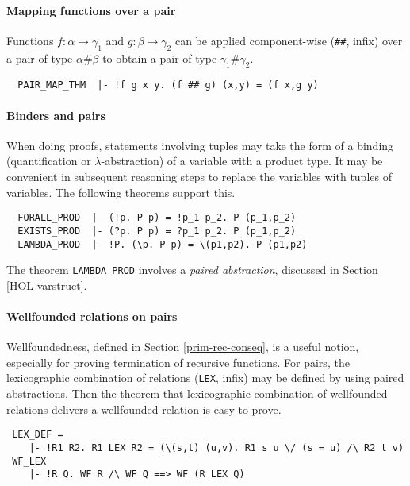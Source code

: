 \paragraph {Mapping functions over a pair}

Functions $f : \alpha \to \gamma_1$ and $g : \beta\to\gamma_2$ can be
applied component-wise ({\small\verb+##+}, infix) over a pair of type
$\alpha \# \beta$ to obtain a pair of type $\gamma_1 \# \gamma_2$.
%
\begin{hol}
{\small
\begin{verbatim}
  PAIR_MAP_THM  |- !f g x y. (f ## g) (x,y) = (f x,g y)
\end{verbatim}
}
\end{hol}

\paragraph {Binders and pairs}

When doing proofs, statements involving tuples may take the form of a
binding (quantification or $\lambda$-abstraction) of a variable with a
product type. It may be convenient in subsequent reasoning steps to
replace the variables with tuples of variables. The following theorems
support this.
%
 \begin{hol}
{\small
\begin{verbatim}
  FORALL_PROD  |- (!p. P p) = !p_1 p_2. P (p_1,p_2)
  EXISTS_PROD  |- (?p. P p) = ?p_1 p_2. P (p_1,p_2)
  LAMBDA_PROD  |- !P. (\p. P p) = \(p1,p2). P (p1,p2)
\end{verbatim}
}
\end{hol}
%
The theorem {\small\verb+LAMBDA_PROD+} involves a \emph{paired
 abstraction}, discussed in Section \ref{HOL-varstruct}.


\paragraph {Wellfounded relations on pairs}

Wellfoundedness, defined in Section \ref{prim-rec-conseq},
is a useful notion, especially for proving termination of
recursive functions. For pairs, the lexicographic combination
of relations ({\small\verb+LEX+}, infix) may be defined by using
paired abstractions. Then the theorem that lexicographic combination
of wellfounded relations delivers a wellfounded relation is easy to
prove.
%
\begin{hol}
{\small
\begin{verbatim}
 LEX_DEF =
    |- !R1 R2. R1 LEX R2 = (\(s,t) (u,v). R1 s u \/ (s = u) /\ R2 t v)
 WF_LEX
    |- !R Q. WF R /\ WF Q ==> WF (R LEX Q)
\end{verbatim}
}
\end{hol}

